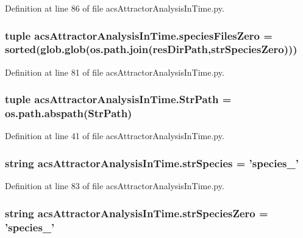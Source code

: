 Definition at line 86 of file acs\-Attractor\-Analysis\-In\-Time.\-py.

\hypertarget{a00097_a4657fd3a80cf1c76ab075d62d8de3bf3}{
\subsubsection[{species\-Files\-Zero}]{\setlength{\rightskip}{0pt plus 5cm}tuple acs\-Attractor\-Analysis\-In\-Time.\-species\-Files\-Zero = sorted(glob.\-glob(os.\-path.\-join({\bf res\-Dir\-Path},{\bf str\-Species\-Zero})))}}\label{a00097_a4657fd3a80cf1c76ab075d62d8de3bf3}


Definition at line 81 of file acs\-Attractor\-Analysis\-In\-Time.\-py.

\hypertarget{a00097_a1d168f4d444ea1d02f186a7568344fba}{
\subsubsection[{Str\-Path}]{\setlength{\rightskip}{0pt plus 5cm}tuple acs\-Attractor\-Analysis\-In\-Time.\-Str\-Path = os.\-path.\-abspath(Str\-Path)}}\label{a00097_a1d168f4d444ea1d02f186a7568344fba}


Definition at line 41 of file acs\-Attractor\-Analysis\-In\-Time.\-py.

\hypertarget{a00097_ac1f05e7db61bcc83ea1ed27460462202}{
\subsubsection[{str\-Species}]{\setlength{\rightskip}{0pt plus 5cm}string acs\-Attractor\-Analysis\-In\-Time.\-str\-Species = 'species\-\_\-'}}\label{a00097_ac1f05e7db61bcc83ea1ed27460462202}


Definition at line 83 of file acs\-Attractor\-Analysis\-In\-Time.\-py.

\hypertarget{a00097_aea2d717887265b294c623099d2495d4f}{
\subsubsection[{str\-Species\-Zero}]{\setlength{\rightskip}{0pt plus 5cm}string acs\-Attractor\-Analysis\-In\-Time.\-str\-Species\-Zero = 'species\-\_\-'}}\label{a00097_aea2d717887265b294c623099d2495d4f}


